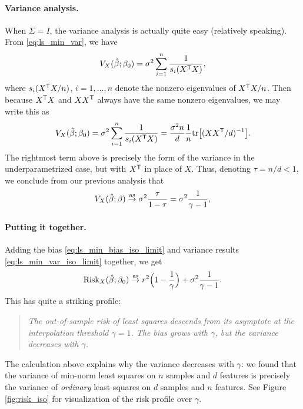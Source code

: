 \documentclass{article}
\begin{document}
\paragraph{Variance analysis.}

When $\Sigma = I$, the variance analysis is actually quite easy (relatively
speaking). From \eqref{eq:ls_min_var}, we have
\[
V_X(\hat{\beta}; \beta_0) = \sigma^2 \sum_{i=1}^n \frac{1}{s_i(X^{\mathsf{T}} X)},
\]
where $s_i(X^{\mathsf{T}} X/n)$, $i=1,\dots,n$ denote the nonzero eigenvalues of $X^{\mathsf{T}} 
X/n$. Then because $X^{\mathsf{T}} X$ and $XX^{\mathsf{T}}$ always have the same nonzero
eigenvalues, we may write this as
\[
V_X(\hat{\beta}; \beta_0) = \sigma^2 \sum_{i=1}^n \frac{1}{s_i(X^{\mathsf{T}} X)} = 
\frac{\sigma^2 n}{d} \frac{1}{n} \mathrm{tr}\big[ (XX^{\mathsf{T}} /d)^{-1} \big].
\]
The rightmost term above is precisely the form of the variance in the
underparametrized case, but with $X^{\mathsf{T}}$ in place of $X$. Thus, denoting $\tau =
n/d < 1$, we conclude from our previous analysis that  
\begin{equation}
\label{eq:ls_min_var_iso_limit}
V_X(\hat{\beta}; \beta) \overset{\mathrm{as}}{\to} \sigma^2 \frac{\tau}{1-\tau} = \sigma^2 
\frac{1}{\gamma-1},  
\end{equation}

\paragraph{Putting it together.}

Adding the bias \eqref{eq:ls_min_bias_iso_limit} and variance results
\eqref{eq:ls_min_var_iso_limit} together, we get
\begin{equation}
\label{eq:ls_min_risk_iso_limit}
\mathrm{Risk}_X(\hat{\beta}; \beta_0) \overset{\mathrm{as}}{\to} r^2 \Big( 1- \frac{1}{\gamma} \Big) + \sigma^2 
\frac{1}{\gamma-1}. 
\end{equation}
This has quite a striking profile:
\begin{quote}
\centering\it
The out-of-sample risk of least squares descends from its asymptote at the
interpolation threshold $\gamma = 1$. The bias grows with $\gamma$, but 
the variance decreases with $\gamma$.      
\end{quote}
The calculation above explains why the variance decreases with $\gamma$: we
found that the variance of min-norm least squares on $n$ samples and $d$
features is precisely the variance of \emph{ordinary} least squares on $d$
samples and $n$ features. See Figure \ref{fig:risk_iso} for visualization of the
risk profile over $\gamma$.
\end{document}
